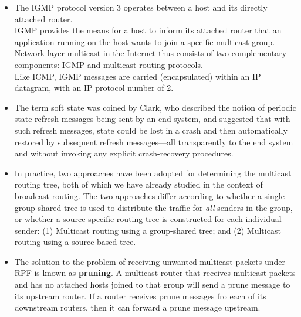 \begin{itemize}
\item
The IGMP protocol version 3 operates between a host and its directly attached router.\\
IGMP provides the means for a host to inform its attached router that an application running on the host wants to join a specific multicast group.\\
Network-layer multicast in the Internet thus consists of two complementary components: IGMP and multicast routing protocols.\\
Like ICMP, IGMP messages are carried (encapsulated) within an IP datagram, with an IP protocol number of 2.

\item
The term soft state was coined by Clark, who described the notion of periodic state refresh messages being sent by an end system, and suggested that with such refresh messages, state could be lost in a crash and then automatically restored by subsequent refresh messages---all transparently to the end system and without invoking any explicit crash-recovery procedures.

\item
In practice, two approaches have been adopted for determining the multicast routing tree, both of which we have already studied in the context of broadcast routing. The two approaches differ according to whether a single group-shared tree is used to distribute the traffic for \textit{all} senders in the group, or whether a source-specific routing tree is constructed for each individual sender: (1) Multicast routing using a group-shared tree; and (2) Multicast routing using a source-based tree.

\item
The solution to the problem of receiving unwanted multicast packets under RPF is known as \textbf{pruning}. A multicast router that receives multicast packets and has no attached hosts joined to that group will send a prune message to its upstream router. If a router receives prune messages fro each of its downstream routers, then it can forward a prune message upstream.


\end{itemize}
